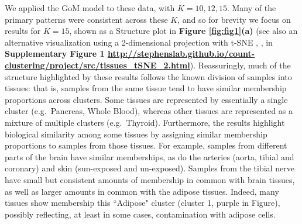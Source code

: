 We applied the GoM model to these data, with $K=10,12,15$. Many of the primary patterns were consistent across these $K$, and so for brevity we focus on results for $K=15$, shown as a Structure plot in \textbf{Figure \ref{fig:fig1}(a)} (see also an alternative visualization using a 2-dimensional projection with t-SNE \cite{Maaten2008}, \cite{Maaten2014}, in \textbf{Supplementary Figure 1 \url{http://stephenslab.github.io/count-clustering/project/src/tissues_tSNE_2.html}}). Reassuringly, much of the structure highlighted by these results follows the known division of samples into tissues: that is, samples from the same tissue tend to have similar membership proportions across clusters. Some tissues are represented by essentially a single cluster (e.g.~Pancreas, Whole Blood), whereas other tissues are represented as a mixture of multiple clusters (e.g.~Thyroid). Furthermore, the results highlight biological similarity among some tissues by assigning similar membership proportions to samples from those tissues.  For example, samples from different parts of the brain have similar memberships, as do the arteries (aorta, tibial and coronary) and skin (sun-exposed and un-exposed). 
 Samples from the tibial nerve have small but consistent amounts of membership in common with brain tissues, as well as larger amounts in common with the adipose tissues. Indeed, many tissues show membership this ``Adipose" cluster (cluster 1, purple in Figure), possibly reflecting, at least in some cases, contamination with adipose cells.

